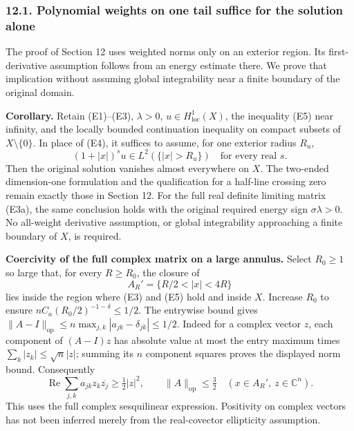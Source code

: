 \documentclass[
  11pt,
]{article}
\makeatletter
\let\ReaderOriginalAnchorStart\hyper@anchorstart
\let\ReaderOriginalAnchorEnd\hyper@anchorend
\let\ReaderPendingAliases\@empty
\def\ReaderArmAliases#1{\gdef\ReaderPendingAliases{#1}}
\def\hyper@anchorstart#1{\ReaderIfNativeAnchorTF{#1}{\ReaderPendingAliases\global\let\ReaderPendingAliases\@empty}{}\ReaderOriginalAnchorStart{#1}}
\makeatother
\begin{document}
\ReaderArmAliases{\ReaderOriginalAnchorStart{AN03-EXU-TAIL-001}\ReaderOriginalAnchorEnd\begingroup\expandafter\def\csname @currentHref\endcsname{AN03-EXU-TAIL-001}\label{AN03-EXU-TAIL-001}\endgroup\ReaderOriginalAnchorStart{polynomial-weights-on-one-tail-suffice-for-the-solution-alone}\ReaderOriginalAnchorEnd}
\subsubsection{12.1. Polynomial weights on one tail suffice for the
solution
alone}\label{polynomial-weights-on-one-tail-suffice-for-the-solution-alone}

The proof of Section 12 uses weighted norms only on an exterior region.
Its first-derivative assumption follows from an energy estimate there.
We prove that implication without assuming global integrability near a
finite boundary of the original domain.

\textbf{Corollary.} Retain (E1)--(E3), \(\lambda>0\),
\(u\in H^1_{\mathrm{loc}}(X)\), the inequality (E5) near infinity, and
the locally bounded continuation inequality on compact subsets of
\(X\setminus\{0\}\). In place of (E4), it suffices to assume, for one
exterior radius \(R_u\), \[
 (1+|x|)^s u\in L^2(\{|x|>R_u\})
 \quad\text{for every real }s.
 \tag{ECT1}
\] Then the original solution vanishes almost everywhere on \(X\). The
two-ended dimension-one formulation and the qualification for a
half-line crossing zero remain exactly those in Section 12. For the full
real definite limiting matrix (E3a), the same conclusion holds with the
original required energy sign \(\sigma\lambda>0\). No all-weight
derivative assumption, or global integrability approaching a finite
boundary of \(X\), is required.

\textbf{Coercivity of the full complex matrix on a large annulus.}
Select \(R_0\geq1\) so large that, for every \(R\geq R_0\), the closure
of \[
 A_R'=\{R/2<|x|<4R\}
\] lies inside the region where (E3) and (E5) hold and inside \(X\).
Increase \(R_0\) to ensure \(nC_a(R_0/2)^{-1-\delta}\leq1/2\). The
entrywise bound gives
\(\|A-I\|_{\mathrm{op}}\leq n\max_{j,k}|a_{jk}-\delta_{jk}|\leq1/2\).
Indeed for a complex vector \(z\), each component of \((A-I)z\) has
absolute value at most the entry maximum times
\(\sum_k|z_k|\leq\sqrt n|z|\); summing its \(n\) component squares
proves the displayed norm bound. Consequently \[
 \operatorname{Re}\sum_{j,k}a_{jk}z_k\overline{z_j}
 \geq\tfrac12|z|^2,\qquad \|A\|_{\mathrm{op}}\leq\tfrac32
 \quad(x\in A_R',\ z\in\mathbb C^n).
 \tag{ECT2}
\] This uses the full complex sesquilinear expression. Positivity on
complex vectors has not been inferred merely from the real-covector
ellipticity assumption.
\end{document}
